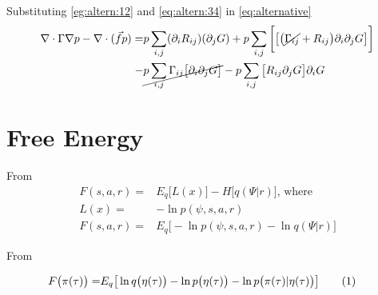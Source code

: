 \documentclass[]{article}
\newcommand\numberthis{\addtocounter{equation}{1}\tag{\theequation}}
\begin{document}
Substituting \eqref{eg:altern:12} and \eqref{eq:altern:34} in \eqref{eq:alternative}
\begin{align*}
	\nabla\cdot\Gamma\nabla p - \nabla \cdot (\vec{f} p) =& p\sum_{i,j} (\partial_i R_{ij})  (\partial_j G)  +p\sum_{i,j} \bigg[ \big[ \big(\cancel{\Gamma_{ij}} +R_{ij}\big)\partial_i \partial_j G \big] \bigg] \\
	-& \cancel{ p\sum_{i,j}\Gamma_{ij}\big[ \partial_i \partial_j G\big]} -  p \sum_{i,j} \big[ R_{ij}\partial_j G\big] \partial_i  G
\end{align*}
\section{Free Energy}


From \cite{friston2016therefore}
\begin{align*}
	F(s,a,r) =& E_q\big[L(x)\big]-H\big[q(\Psi\vert r)\big] \text{, where}\\
	L(x) =& -\ln{p(\psi,s,a,r)}\\
	F(s,a,r) =&  E_q\big[ -\ln{p(\psi,s,a,r)} - \ln{q(\Psi\vert r)}\big]
\end{align*}

From \cite{friston2022free}

\begin{align*}
	F\big(\pi(\tau)\big) =& E_q\big[\ln q\big(\eta(\tau)\big) - \ln p\big(\eta(\tau)\big) - \ln p\big(\pi(\tau)\vert\eta(\tau)\big)\big] \numberthis \label{eq:free:energy}
\end{align*}
\end{document}
